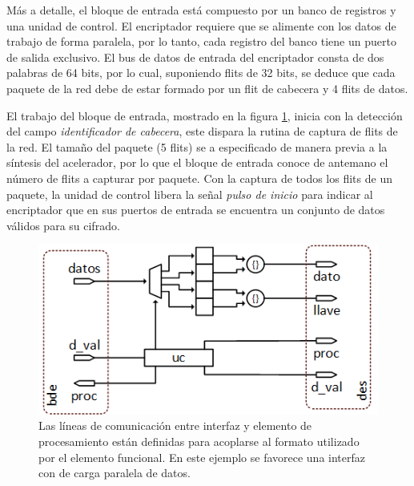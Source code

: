 Más a detalle, el bloque de entrada está compuesto por un banco de registros y una unidad de control. El encriptador requiere que se alimente con los datos de trabajo de forma paralela, por lo tanto, cada registro del banco tiene un puerto de salida exclusivo. El bus de datos de entrada del encriptador consta de dos palabras de 64 bits, por lo cual, suponiendo flits de 32 bits, se deduce que cada paquete de la red debe de estar formado por un flit de cabecera y 4 flits de datos.

El trabajo del bloque de entrada, mostrado en la figura \ref{fig:ch4_bloque_entrada_des}, inicia con la detección del campo \textit{identificador de cabecera}, este dispara la rutina de captura de flits de la red. El tamaño del paquete (5 flits) se a especificado de manera previa a la síntesis del acelerador, por lo que el bloque de entrada conoce de antemano el número de flits a capturar por paquete. Con la captura de todos los flits de un paquete, la unidad de control libera la señal \textit{pulso de inicio} para indicar al encriptador que en sus puertos de entrada se encuentra un conjunto de datos válidos para su cifrado.


\begin{figure}
	\begin{center}
		\includegraphics[scale=0.6]{figures/ch4_bloque_entrada_des.png}
	\end{center}
	\caption
		{	
			Las líneas de comunicación entre interfaz y elemento de procesamiento están definidas para acoplarse al formato utilizado por el elemento funcional. En este ejemplo se favorece una interfaz con de carga paralela de datos.
		}
	\label{fig:ch4_bloque_entrada_des}
\end{figure}

